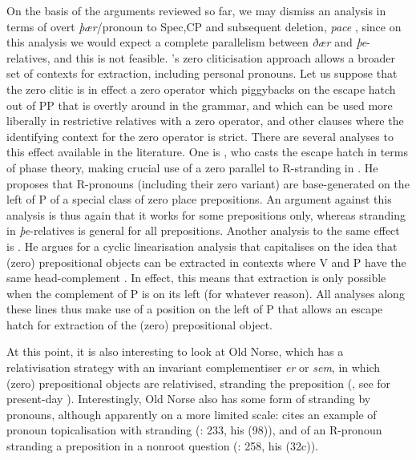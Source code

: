 \documentclass[output=paper]{langsci/langscibook}
\begin{document}
On the basis of the arguments reviewed so far, we may dismiss an analysis in
terms of  overt \textit{þær}/pronoun  to Spec,CP and subsequent
deletion, \emph{pace} \citet{Vat1978}, since on this analysis we would expect a
complete parallelism between \textit{ðær} and \textit{þe}-relatives, and this
is not feasible. ’s zero cliticisation approach
allows a broader set of contexts for extraction, including personal pronouns.
Let us suppose that the zero clitic is in effect a zero operator which
piggybacks on the escape hatch out of PP that is overtly around in the grammar,
and which can be used more liberally in restrictive relatives with a zero
operator, and other clauses where the identifying context for the zero operator
is strict. There are several analyses to this effect available in the
literature. One is \textcite{Abels2003,Abels2012}, who casts the escape hatch
in terms of phase theory, making crucial use of a zero parallel to R-stranding
in . He proposes that  R-pronouns (including their zero variant) are
base-generated on the left of P of a special class of zero place prepositions.
An argument against this analysis is thus again that it works for some
prepositions only, whereas stranding in \textit{þe}-relatives is general for
all prepositions. Another analysis to the same effect is \citet{Matsumoto2013}.
He argues for a cyclic linearisation analysis that capitalises on the idea that
(zero) prepositional objects can be extracted in contexts where V and P have
the same head-complement . In effect, this means that extraction is
only possible when the complement of P is on its left (for whatever reason).
All analyses along these lines thus make use of a position on the left of P
that allows an escape hatch for extraction of the (zero) prepositional object.

At this point, it is also interesting to look at Old Norse, which has a
relativisation strategy with an invariant complementiser \textit{er} or
\textit{sem}, in which (zero) prepositional objects are relativised, stranding
the preposition (\citealt[260]{Faarlund2004}, see \citealt{Maling1976} for
present-day ). Interestingly, Old Norse also has some form of
stranding by pronouns, although apparently on a more limited scale:
\citet{Faarlund2004} cites an example of pronoun topicalisation with stranding
(\citeyear{Faarlund2004}: 233, his (98)), and of an R-pronoun stranding a
preposition in a nonroot question (\citeyear{Faarlund2004}: 258, his (32c)).
\end{document}
